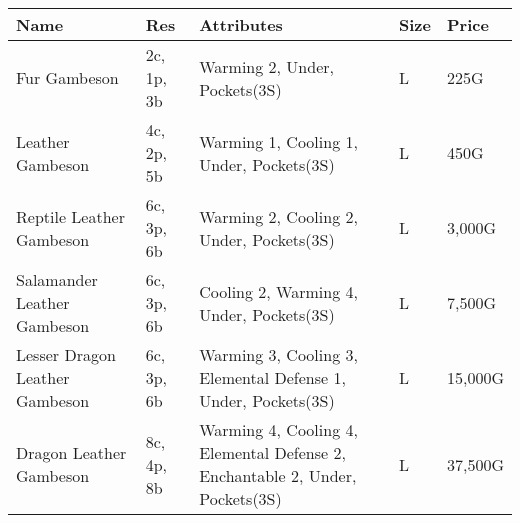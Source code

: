 \begin{longtable}{p{3.5cm} | p{1.5cm} | p{5cm} | p{1cm} | p{1.25cm}}
	Name & Res & Attributes & Size & Price\\ \hline

	Fur Gambeson & 2c, 1p, 3b & Warming 2, Under, Pockets(3S) & L & 225G\\

	Leather Gambeson & 4c, 2p, 5b & Warming 1, Cooling 1, Under, Pockets(3S) & L & 450G\\

	Reptile Leather Gambeson & 6c, 3p, 6b & Warming 2, Cooling 2, Under, Pockets(3S) & L & 3,000G\\

	Salamander Leather Gambeson & 6c, 3p, 6b & Cooling 2, Warming 4, Under, Pockets(3S) & L & 7,500G\\

	Lesser Dragon Leather Gambeson & 6c, 3p, 6b & Warming 3, Cooling 3, Elemental Defense 1, Under, Pockets(3S) & L & 15,000G\\

	Dragon Leather Gambeson & 8c, 4p, 8b & Warming 4, Cooling 4, Elemental Defense 2, Enchantable 2, Under, Pockets(3S) & L & 37,500G\\
\end{longtable}
%
%
%
%
%
%
